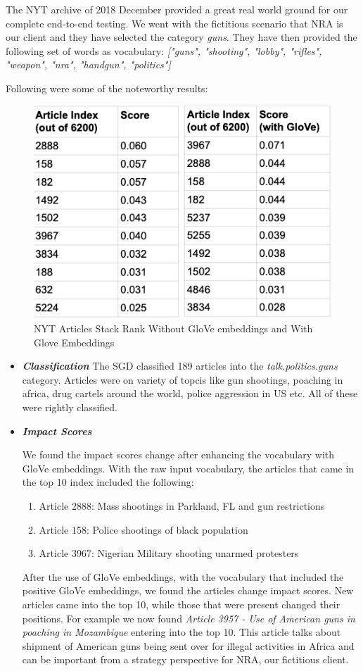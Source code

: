 \documentclass[paper=a4, fontsize=11pt]{scrartcl}
\numberwithin{equation}{section}		%
\numberwithin{figure}{section}			%
\numberwithin{table}{section}				%
\begin{document}
The NYT archive of 2018 December provided a great real world ground for our complete end-to-end testing. We went with the fictitious scenario that NRA is our client and they have selected the category \textit{guns}. They have then provided the following set of words as vocabulary: \textit{["guns", "shooting", "lobby", "rifles", "weapon", "nra", "handgun", "politics"]}

Following were some of the noteworthy results:

\begin{figure}[H]
	\centering
 	 \includegraphics[width=0.6\linewidth]{nyt_articles_stackrank.png}
	  \caption{NYT Articles Stack Rank Without GloVe embeddings and With Glove Embeddings}
 	 \label{fig:NYT Articles}
\end{figure}

\begin {itemize}
\item {\textbf{\textit{Classification}}} The SGD classified 189 articles into the \textit{talk.politics.guns} category. Articles were on variety of topcis like gun shootings, poaching in africa, drug cartels around the world, police aggression in US etc. All of these were rightly classified.

\item {\textbf{\textit{Impact Scores}}}
\par We found the impact scores change after enhancing the vocabulary with GloVe embeddings. With the raw input vocabulary, the articles that came in the top 10 index included the following:

\begin {enumerate}
\item Article 2888: Mass shootings in Parkland, FL and gun restrictions
\item Article 158: Police shootings of black population
\item Article 3967: Nigerian Military shooting unarmed protesters
\end {enumerate}

\par After the use of GloVe embeddings, with the vocabulary that included the positive GloVe embeddings, we found the articles change impact scores. New articles came into the top 10, while those that were present changed their positions. For example we now found \textit{Article 3957 - Use of American guns in poaching in Mozambique} entering into the top 10. This article talks about shipment of American guns being sent over for illegal activities in Africa and can be important from a strategy perspective for NRA, our fictitious client.

\end{itemize}
\end{document}
